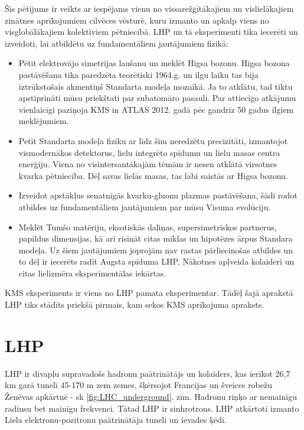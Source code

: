 \label{sec:experimental_setup}

Šis pētījums ir veikts ar iespējams vienu no vissarežģītākajiem un vislielākajiem zinātnes aprīkojumiem cilvēces vēsturē, kuru izmanto un apkalp viens no visglobālākajiem kolektīviem pētniecībā. LHP un tā eksperimenti tika iecerēti un izveidoti, lai atbildētu uz fundamentāliem jautājumiem fizikā:

\begin{itemize}
\item Pētīt elektrovājo simetrijas laušanu un meklēt Higsa bozonu. Higsa bozona pastāvēšana tika paredzēta teorētiski 1964.g.  \cite{Higgs:1964ia} \cite{Englert:1964et} un ilgu laiku tas bija iztrūkstošais akmentiņš Standarta modeļa mozaīkā. Ja to atklātu, tad tiktu apstiprināti mūsu priekštati par subatomāro pasauli. Par attiecīgo atkājumu vienlaicīgi paziņoja KMS in ATLAS 2012. gadā \cite{Chatrchyan:2012xdj} \cite{Aad:2012tfa} pēc gandrīz 50 gadus ilgiem meklējumiem.
\item Petīt Standarta modeļa fiziku ar līdz šim neredzētu precizitāti, izmantojot vismodernākos detektorus, lielu integrēto spīdumu un lielu masas centra enerģiju. Viena no visintersantākajām tēmām ir nesen atklātā virsotnes kvarka pētniecība. Dēļ savas lielās masas, tas labi saistās ar Higsa bozonu.
\item Izveidot apstākļus senatnīgās kvarku-gluonu plazmas pastāvēšana, šādi rodot atbildes uz fundamentāliem jautājumiem par mūsu Visuma evolūciju.
\item Meklēt Tumšo matēriju, eksotiskās daļiņas, supersimetriskos partnerus, \gls{papildus dimensijas}, kā arī risināt citas mīklas un hipotēzes ārpus Standara modeļa. Uz šiem jautājumiem joprojām nav rastas pārliecinošas atbildes un to dēļ ir iecerēts radīt \gls{Augsta spīduma LHP}, \gls{Nākotnes apļveida kolaideri} un citas lielizmēra eksperimentālas iekārtas. 
\end {itemize}

KMS eksperiments ir viens no LHP pamata eksperimentar. Tādēļ šajā aprakstā LHP tiks stādīts priekšā pirmais, kam sekos KMS aprīkojuma apraksts.

\section{LHP}

LHP ir divapļu supravadošs hadronu paātrinātājs un kolaiders, kas ierīkot 26,7 km garā tunelī 45-170 m zem zemes, šķērsojot Francijas un šveices robežu Ženēvas apkārtnē - sk \ref{fig:LHC_underground}. zīm. Hadronu riņķo ar nemainīgu radiusu bet mainīgu frekvenci. Tātad LHP ir sinhrotrons. LHP atkārtoti izmanto Liela elektronu-pozitronu paātrinātāja tuneli un \gls{ievades ķēdi}.

